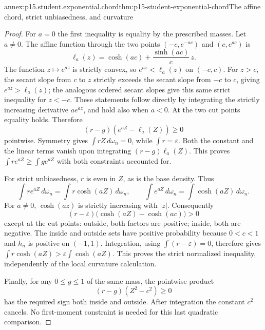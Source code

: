 \begin{annexitem}{annex:p15.student.exponential.chord}{thm:p15-student-exponential-chord}{The affine chord, strict unbiasedness, and curvature}
\begin{proof}
For \(a=0\) the first inequality is equality
by the prescribed masses. Let \(a\ne0\).
The affine function through the two points
\((-c,e^{-ac})\) and \((c,e^{ac})\) is
\[
        \ell_a(z)=\cosh(ac)+\frac{\sinh(ac)}c\,z.
\]
The function \(z\mapsto e^{az}\) is strictly
convex, so \(e^{az}<\ell_a(z)\) on \((-c,c)\).
For \(z>c\), the secant slope from \(c\) to
\(z\) strictly exceeds the secant slope from
\(-c\) to \(c\), giving
\(e^{az}>\ell_a(z)\); the analogous ordered
secant slopes give this same strict inequality
for \(z<-c\). These statements follow directly
by integrating the strictly increasing
derivative \(a e^{az}\), and hold also when
\(a<0\). At the two cut points equality holds.
Therefore
\[
                   (r-g)(e^{aZ}-\ell_a(Z))\geq0
\]
pointwise. Symmetry gives
\(\int rZ\,d\omega_n=0\), while \(\int r=\varepsilon\).
Both the constant and the linear terms vanish
upon integrating \((r-g)\ell_a(Z)\).
This proves \(\int r e^{aZ}\geq\int g e^{aZ}\)
with both constraints accounted for.

For strict unbiasedness, \(r\) is even in
\(Z\), as is the base density. Thus
\[
 \int r e^{aZ}\,d\omega_n=\int r\cosh(aZ)\,d\omega_n,
 \qquad
 \int e^{aZ}\,d\omega_n=\int\cosh(aZ)\,d\omega_n.
\]
For \(a\ne0\), \(\cosh(az)\) is strictly
increasing with \(|z|\).
Consequently
\[
       (r-\varepsilon)
              \bigl(\cosh(aZ)-\cosh(ac)\bigr)>0
\]
except at the cut points: outside, both factors
are positive; inside, both are negative.
The inside and outside sets have positive
probability because \(0<c<1\) and \(h_n\)
is positive on \((-1,1)\).
Integration, using \(\int(r-\varepsilon)=0\),
therefore gives
\(\int r\cosh(aZ)>\varepsilon\int\cosh(aZ)\).
This proves the strict normalized inequality,
independently of the local curvature calculation.

Finally, for any \(0\leq g\leq1\) of the same
mass, the pointwise product
\[
                         (r-g)(Z^2-c^2)\geq0
\]
has the required sign both inside and outside.
After integration the constant \(c^2\) cancels.
No first-moment constraint is needed for
this last quadratic comparison.
\end{proof}
\end{annexitem}

